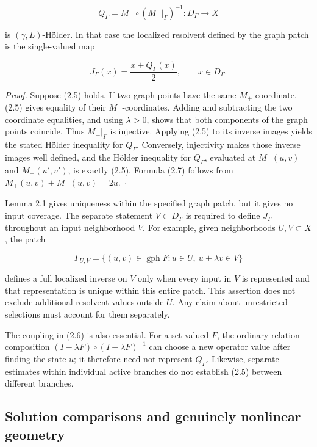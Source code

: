 \documentclass[11pt,a4paper]{article}
\theoremstyle{plain}
\theoremstyle{definition}
\theoremstyle{remark}
\begin{document}
\[
Q_\Gamma=M_-\circ(M_+|_\Gamma)^{-1}:D_\Gamma\to X
\tag{2.6}
\]

is \((\gamma,L)\)-Hölder. In that case the localized resolvent defined
by the graph patch is the single-valued map

\[
J_\Gamma(x)=\frac{x+Q_\Gamma(x)}2,
\qquad x\in D_\Gamma.
\tag{2.7}
\]

\emph{Proof.} Suppose (2.5) holds. If two graph points have the same
\(M_+\)-coordinate, (2.5) gives equality of their \(M_-\)-coordinates.
Adding and subtracting the two coordinate equalities, and using
\(\lambda>0\), shows that both components of the graph points coincide.
Thus \(M_+|_\Gamma\) is injective. Applying (2.5) to its inverse images
yields the stated Hölder inequality for \(Q_\Gamma\). Conversely,
injectivity makes those inverse images well defined, and the Hölder
inequality for \(Q_\Gamma\), evaluated at \(M_+(u,v)\) and
\(M_+(u',v')\), is exactly (2.5). Formula (2.7) follows from
\(M_+(u,v)+M_-(u,v)=2u\). \(\square\)

Lemma 2.1 gives uniqueness within the specified graph patch, but it
gives no input coverage. The separate statement \(V\subset D_\Gamma\) is
required to define \(J_\Gamma\) throughout an input neighborhood \(V\).
For example, given neighborhoods \(U,V\subset X\), the patch

\[
\Gamma_{U,V}
=\{(u,v)\in\operatorname{gph}F:u\in U,\ u+\lambda v\in V\}
\tag{2.8}
\]

defines a full localized inverse on \(V\) only when every input in \(V\)
is represented and that representation is unique within this entire
patch. This assertion does not exclude additional resolvent values
outside \(U\). Any claim about unrestricted selections must account for
them separately.

The coupling in (2.6) is also essential. For a set-valued \(F\), the
ordinary relation composition \((I-\lambda F)\circ(I+\lambda F)^{-1}\)
can choose a new operator value after finding the state \(u\); it
therefore need not represent \(Q_\Gamma\). Likewise, separate estimates
within individual active branches do not establish (2.5) between
different branches.

\hypertarget{solution-comparisons-and-genuinely-nonlinear-geometry}{%
\subsection{Solution comparisons and genuinely nonlinear
geometry}\label{solution-comparisons-and-genuinely-nonlinear-geometry}}
\end{document}
